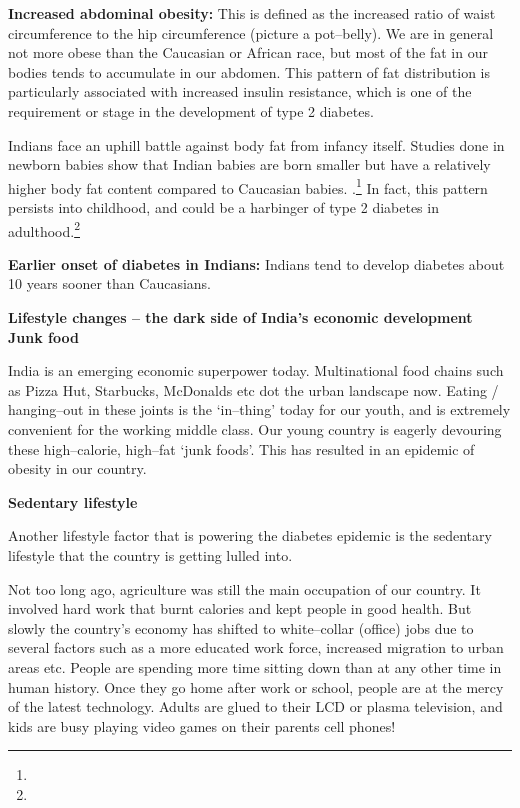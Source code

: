 \item 
 \textbf{Increased abdominal obesity:} This is defined as the increased ratio of waist circumference to the hip circumference (picture a pot–belly). We are in general not more obese than the Caucasian or African race, but most of the fat in our bodies tends to accumulate in our abdomen.\supskpt{\footnote{}} This pattern of fat distribution is particularly associated with increased insulin resistance, which is one of the requirement or stage in the development of type 2 diabetes.

\begin{figure}\end{figure}
\begin{figure}\end{figure}

 \item Indians face an uphill battle against body fat from infancy itself. Studies done in newborn babies show that Indian babies are born smaller but have a relatively higher body fat content compared to Caucasian babies. .\footnote{} In fact, this pattern persists into childhood, and could be a harbinger of type 2 diabetes in adulthood.\footnote{}

 \item \textbf{Earlier onset of diabetes in Indians:} Indians tend to develop diabetes about 10 years sooner than Caucasians.

\textbf{Lifestyle changes – the dark side of India’s economic development Junk food}

India is an emerging economic superpower today. Multinational food chains such as Pizza Hut, Starbucks, McDonalds etc dot the urban landscape now. Eating / hanging–out in these joints is the ‘in–thing’ today for our youth, and is extremely convenient for the working middle class. Our young country is eagerly devouring these high–calorie, high–fat ‘junk foods’. This has resulted in an epidemic of obesity in our country.

\textbf{Sedentary lifestyle}

Another lifestyle factor that is powering the diabetes epidemic is the sedentary lifestyle that the country is getting lulled into.

Not too long ago, agriculture was still the main occupation of our country. It involved hard work that burnt calories and kept people in good health. But slowly the country’s economy has shifted to white–collar (office) jobs due to several factors such as a more educated work force, increased migration to urban areas etc. People are spending more time sitting down than at any other time in human history. Once they go home after work or school, people are at the mercy of the latest technology. Adults are glued to their LCD or plasma television, and kids are busy playing video games on their parents cell phones!

